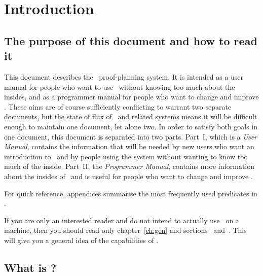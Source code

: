 \def\rcsid{$Id: Introduction.tex,v 1.8 1999/03/31 11:08:49 img Exp $}


\chapter {Introduction}
\label{intro}



\section {The purpose of this document and how to read it}
This document describes the \clam\ proof-planning system. It is
intended as a user manual for people who want to use \clam\ without
knowing too much about the insides, and as a programmer manual for
people who want to change and improve \clam. These aims are of course
sufficiently conflicting to warrant two separate documents, but the
state of flux of \clam\ and related systems means it will be difficult
enough to maintain one document, let alone two. In order to satisfy
both goals in one document, this document is separated into two
parts. Part~I, which is a {\em User Manual}, contains the information
that will be needed by new users who want an introduction to \clam\
and by people using the system without wanting to know too much of the
inside. Part~II, the {\em Programmer Manual}, contains more
information about the insides of \clam\ and is useful for people who
want to change and improve \clam.

For quick reference, appendices summarise the most frequently used
predicates in \clam.

If you are only an interested reader and do not intend to actually use
\clam\ on a machine, then you should read only chapter~\ref{ch:gen}
and sections~\reference{intro} and~\reference{methods}.  This will
give you a general idea of the capabilities of \clam.

\iffalse
If you are a novice user and want to start playing straight away
without ploughing through too many pages of manual, read this section,
\S\reference{library} (on the library mechanism) and
\S\reference{top-level-preds} (which gives a summary of
top-level predicates).
\fi

\section {What is \protect \clam?}

